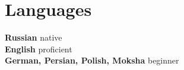 \documentclass[11pt]{article} %
\begin{document}
\section*{Languages}

\textbf{Russian} native\\
\textbf{English} proficient\\
\textbf{German, Persian, Polish, Moksha} beginner




\end{document}
